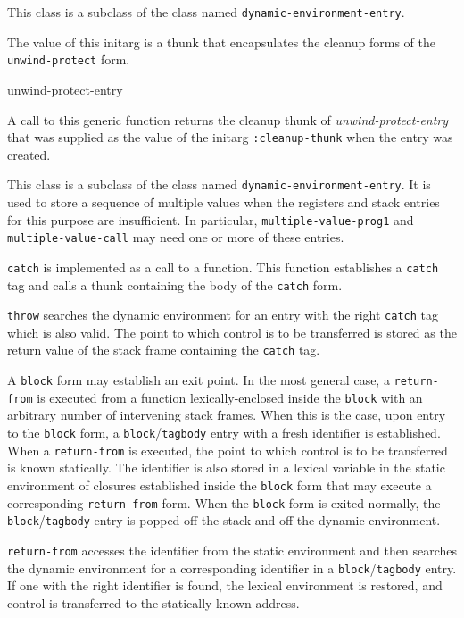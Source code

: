 This class is a subclass of the class named
\texttt{dynamic-environment-entry}.


The value of this initarg is a thunk that encapsulates the cleanup
forms of the \texttt{unwind-protect} form.

 {unwind-protect-entry}

A call to this generic function returns the cleanup thunk of
\textit{unwind-protect-entry} that was supplied as the value of the
initarg \texttt{:cleanup-thunk} when the entry was created.


This class is a subclass of the class named
\texttt{dynamic-environment-entry}.  It is used to store a sequence of
multiple values when the registers and stack entries for this purpose
are insufficient.  In particular, \texttt{multiple-value-prog1} and
\texttt{multiple-value-call} may need one or more of these entries.

\texttt{catch} is implemented as a call to a function.  This function
establishes a \texttt{catch} tag and calls a thunk containing the body
of the \texttt{catch} form.

\texttt{throw} searches the dynamic environment for an entry with the
right \texttt{catch} tag which is also valid.  The point to which
control is to be transferred is stored as the return value of the
stack frame containing the \texttt{catch} tag.

A \texttt{block} form may establish an exit point.  In the most
general case, a \texttt{return-from} is executed from a function
lexically-enclosed inside the \texttt{block} with an arbitrary number
of intervening stack frames.  When this is the case, upon entry to the
\texttt{block} form, a \texttt{block}/\texttt{tagbody} entry with a
fresh identifier is established.  When a \texttt{return-from} is
executed, the point to which control is to be transferred is known
statically.  The identifier is also stored in a lexical variable in
the static environment of closures established inside the
\texttt{block} form that may execute a corresponding
\texttt{return-from} form.  When the \texttt{block} form is exited normally, the
\texttt{block}/\texttt{tagbody} entry is popped off the stack and off
the dynamic environment.

\texttt{return-from} accesses the identifier from the static
environment and then searches the dynamic environment for a
corresponding identifier in a \texttt{block}/\texttt{tagbody} entry.
If one with the right identifier is found, the lexical environment is
restored, and control is transferred to the statically known address.

